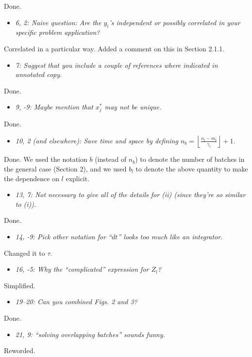 \documentclass[11pt,notitlepage,onecolumn]{article}
\newcommand{\noi}{\noindent}
\begin{document}
\noindent  
Done. 
\medskip 


\begin{itemize}
\item \textit{6, 2: Naive question: Are the $y_i$'s independent or possibly correlated in your specific problem application?}
\end{itemize}

\noi
Correlated in a particular way. 
Added a comment on this in Section 2.1.1.
\medskip 


\begin{itemize}
\item \textit{7: Suggest that you include a couple of references where indicated in annotated copy.}
\end{itemize}

\noi
Done. 
\medskip 


\begin{itemize}
\item \textit{9, -9: Maybe mention that $x_j^*$ may not be unique.}
\end{itemize}

\noi
Done.
\medskip 


\begin{itemize}
\item \textit{10, 2 (and elsewhere): Save time and space by defining $n_b =\left\lfloor\tfrac{n_l-m_l}{\gamma_l}\right\rfloor+1$.}
\end{itemize}

\noi
Done.
We used the notation $b$ (instead of $n_b$) to denote the number of batches in the general case (Section 2), and we used $b_l$ to denote the above quantity to make the dependence on $l$ explicit.  
\medskip 


\begin{itemize}
\item \textit{13, 7: Not necessary to give all of the details for (ii) (since they're so similar to (i)).}
\end{itemize}

\noi
Done.
\medskip 


\begin{itemize}
\item \textit{14, -9: Pick other notation for ``$dt$'' looks too much like an integrator.}
\end{itemize}

\noi
Changed it to $\tau$.
\medskip 


\begin{itemize}
\item \textit{16, -5: Why the ``complicated'' expression for $Z_l$?}
\end{itemize}

\noi
Simplified.
\medskip 


\begin{itemize}
\item \textit{19--20: Can you combined Figs. 2 and 3?}
\end{itemize}

\noi
Done.  
\medskip 


\begin{itemize}
\item \textit{21, 9: ``solving overlapping batches'' sounds funny.}
\end{itemize}

\noi
Reworded.
\medskip 
\end{document}
